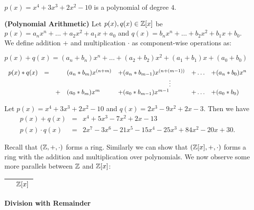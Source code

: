 \example $p(x)=x^4+3x^3+2x^2-10$ is a polynomial of degree $4$.

\begin{definition}{\textbf{(Polynomial Arithmetic)}}
  Let $p(x),q(x)\in\mathbb{Z}[x]$ be $p(x)=a_nx^n+\ldots+a_2x^2+a_1x+a_0$ and
  $q(x)=b_nx^n+\ldots+b_2x^2+b_1x+b_0$. We define addition $+$ and multiplication
  $\cdot$ as component-wise operations as:

  \begin{romanenum}
  \item $p(x)+q(x)=(a_n+b_n)x^n+\ldots+(a_2+b_2)x^2+(a_1+b_1)x+(a_0+b_0)$
  \item $\begin{array}[t]{lllllll}
      p(x)*q(x)&=&&(a_n*b_m)x^{(n+m)}&+(a_n*b_{m-1})x^{(n+(m-1))}&+\ldots&+(a_n*b_{0})x^n\\
      & &&&\qquad\qquad\qquad\qquad\vdots\\
      && + &(a_0*b_m)x^m&+(a_0*b_{m-1})x^{m-1}&+\ldots&+(a_0*b_{0})
    \end{array}$
  \end{romanenum}
  
\end{definition}

\example Let $p(x)=x^4+3x^3+2x^2-10$ and $q(x)=2x^3-9x^2+2x-3$. Then we have
\begin{eqnarray*}
p(x)+q(x)&=&x^4+5x^3-7x^2+2x-13\\
p(x)\cdot q(x)&=&2x^7-3x^6-21x^5-15x^4-25x^3+84x^2-20x+30.
\end{eqnarray*}

Recall that $(\mathbb{Z},+,\cdot)$ forms a ring. Similarly we can show that
$(\mathbb{Z}[x],+,\cdot)$ forms a ring with the addition and multiplication over
polynomials. We now observe some more parallels between $\Z$ and $\mathbb{Z}[x]$:


\begin{tabular}{p{}|p{}}
  \centering{$\Z$} & \qquad\qquad\qquad\qquad$\mathbb{Z}[x]$\\\hline
\end{tabular}

\vspace{.4cm}\textbf{Division with Remainder}\vspace{.1cm}

